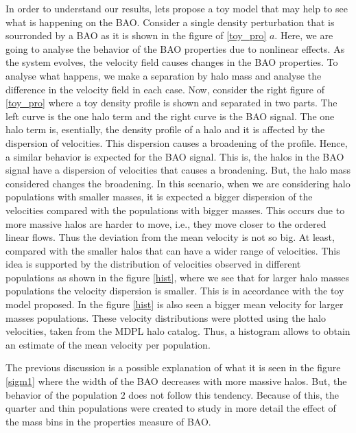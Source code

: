 In order to understand our results, lets propose a toy model that may help 
to see what is happening on the BAO.
Consider a single density perturbation that is sourronded 
by a BAO as it is shown in the figure of \ref{toy_pro} $a$. 
Here, we are going to analyse the behavior of the BAO properties due to nonlinear 
effects. As the system evolves, the velocity field causes changes in the BAO properties. 
To analyse what happens, we make a separation by halo mass and analyse the difference
in the velocity field in each case. 
Now, consider the right figure of \ref{toy_pro} where a toy density profile is shown 
and separated in two parts. The left curve is 
the one halo term  and the right curve is the BAO signal. 
The one halo term is, esentially, the density profile of a halo 
and it is affected by the dispersion of velocities. 
This dispersion causes a broadening of the profile. Hence, a similar behavior 
is expected for the BAO signal. This is, the halos 
in the BAO signal have a dispersion of velocities that causes a broadening.
But, the halo mass considered changes the broadening. 
In this scenario, when we are considering halo populations with smaller 
masses, it is expected a bigger dispersion of the velocities compared with the populations 
with bigger masses. 	This occurs due to more massive halos are harder to move, 
i.e., they move closer to the ordered linear flows. Thus the 
deviation from the mean velocity is not so big. At least,  compared  with the smaller halos 
that can have a wider range of velocities. This idea is supported by the distribution
of velocities observed in different populations as shown in the figure \ref{hist}, where
we see that for larger halo masses populations the velocity dispersion is smaller. This is
in accordance with the toy model proposed. 
In the figure \ref{hist} is also seen a bigger mean velocity for larger masses populations. 
These velocity distributions were plotted using the halo velocities, taken from the MDPL halo catalog. Thus, a histogram allows to obtain an estimate of the mean velocity per population. 


The previous discussion is a possible explanation of what it is seen in the
figure \ref{sigm1} where the width of the BAO decreases with more massive halos.
But, the behavior of the population $2$ does not follow this tendency. Because of this,
the quarter and thin populations were created to study in more detail the effect of
the mass bins in the properties measure of BAO. 



